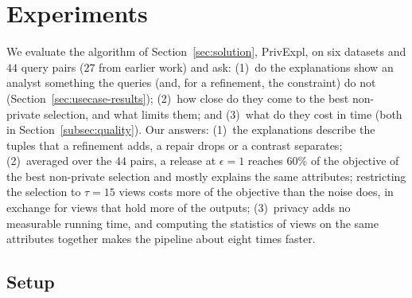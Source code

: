 \section{Experiments}
\label{sec:experiments}

We evaluate the algorithm of Section~\ref{sec:solution}, \textsf{PrivExpl}, on six datasets and $44$ query pairs ($27$ from earlier work) and ask:
(1)~do the explanations show an analyst something the queries (and, for a refinement, the constraint) do not (Section~\ref{sec:usecase-results});
(2)~how close do they come to the best non-private selection, and what limits them; and (3)~what do they cost in time (both in Section~\ref{subsec:quality}).
Our answers:
(1)~the explanations describe the tuples that a refinement adds, a repair drops or a contrast separates;
(2)~averaged over the $44$ pairs, a release at $\epsilon=1$ reaches $60\%$ of the objective of the best non-private selection and mostly explains the same attributes; restricting the selection to $\tau=15$ views costs more of the objective than the noise does, in exchange for views that hold more of the outputs;
(3)~privacy adds no measurable running time, and computing the statistics of views on the same attributes together makes the pipeline about eight times faster.

\subsection{Setup}
\label{subsec:experimental-setup}

\begin{table}[t]
\centering
\small
\caption{Datasets and the source of their query pairs. On IPUMS-CPS $|\mathcal{P}|$ depends on the attribute each question removes.}
\label{tab:datasets}
\setlength{\tabcolsep}{3pt}
\end{table}

